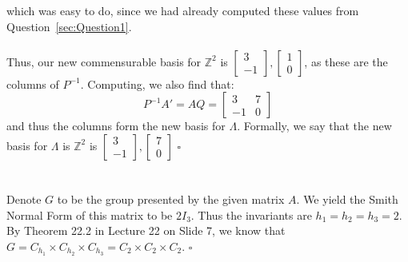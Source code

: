 \documentclass[letterpaper]{article}
\newcommand*{\QED}{\hfill\ensuremath{\square}}%
\begin{document}
which was easy to do, since we had already computed these values from Question~\ref{sec:Question1}.
\\ \\
Thus, our new commensurable basis for $ \mathbb{Z}^2 $ is $ \begin{bmatrix} 3 \\ -1 \end{bmatrix}, \begin{bmatrix} 1 \\ 0 \end{bmatrix} $, as these are the columns of $ P^{-1} $.
Computing, we also find that:
\[
P^{-1} A' = AQ = \begin{bmatrix} 3 & 7 \\ -1 & 0 \end{bmatrix}
\]
and thus the columns form the new basis for $ \Lambda $.
Formally, we say that the new basis for $ \Lambda $ is $ \mathbb{Z}^2 $ is $ \begin{bmatrix} 3 \\ -1 \end{bmatrix}, \begin{bmatrix} 7 \\ 0 \end{bmatrix} $
\QED{}

\section{}
\label{sec:Question7}

Denote $ G $ to be the group presented by the given matrix $ A $.
We yield the Smith Normal Form of this matrix to be $ 2 I_3 $.
Thus the invariants are $ h_1 = h_2 = h_3 = 2 $.
By Theorem 22.2 in Lecture 22 on Slide 7, we know that $ G = C_{h_1} \times C_{h_2} \times C_{h_3} = C_2 \times C_2 \times C_2 $.
\QED{}
\end{document}
